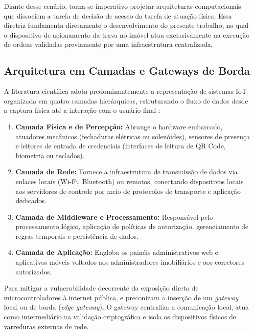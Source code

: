Diante desse cenário, torna-se imperativo projetar arquiteturas computacionais que dissociem a tarefa de decisão de acesso da tarefa de atuação física. Essa diretriz fundamenta diretamente o desenvolvimento do presente trabalho, no qual o dispositivo de acionamento da trava no imóvel atua exclusivamente na execução de ordens validadas previamente por uma infraestrutura centralizada.

\subsection{Arquitetura em Camadas e Gateways de Borda}
\label{subsec:iot-arquitetura}

A literatura científica adota predominantemente a representação de sistemas IoT organizada em quatro camadas hierárquicas, estruturando o fluxo de dados desde a captura física até a interação com o usuário final \cite{vardakis2024}:

\begin{enumerate}
    \item \textbf{Camada Física e de Percepção:} Abrange o hardware embarcado, atuadores mecânicos (fechaduras elétricas ou solenóides), sensores de presença e leitores de entrada de credenciais (interfaces de leitura de QR Code, biometria ou teclados).
    \item \textbf{Camada de Rede:} Fornece a infraestrutura de transmissão de dados via enlaces locais (Wi-Fi, Bluetooth) ou remotos, conectando dispositivos locais aos servidores de controle por meio de protocolos de transporte e aplicação dedicados.
    \item \textbf{Camada de Middleware e Processamento:} Responsável pelo processamento lógico, aplicação de políticas de autorização, gerenciamento de regras temporais e persistência de dados.
    \item \textbf{Camada de Aplicação:} Engloba os painéis administrativos web e aplicativos móveis voltados aos administradores imobiliários e aos corretores autorizados.
\end{enumerate}

Para mitigar a vulnerabilidade decorrente da exposição direta de microcontroladores à internet pública,  e  preconizam a inserção de um \textit{gateway} local ou de borda (\textit{edge gateway}). O gateway centraliza a comunicação local, atua como intermediário na validação criptográfica e isola os dispositivos físicos de varreduras externas de rede. 


